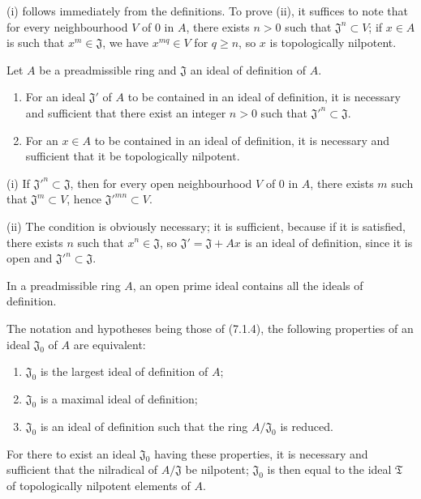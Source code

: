 (i) follows immediately from the definitions. To prove (ii), it suffices to
note that for every neighbourhood $V$ of $0$ in $A$, there exists $n>0$ such that
$\mathfrak J^n\subset V$; if $x\in A$ is such that $x^m\in\mathfrak J$, we have
$x^{mq}\in V$ for $q\geq n$, so $x$ is topologically nilpotent.

\begin{proposition}[7.1.4]
\label{0.7.1.4}
Let $A$ be a preadmissible ring and $\mathfrak J$ an ideal of definition of
$A$.
\begin{enumerate}
  \item[{\upshape(i)}] For an ideal $\mathfrak J'$ of $A$ to be contained
    in an ideal of definition, it is necessary and sufficient that there exist an integer
    $n>0$ such that ${\mathfrak J'}^n\subset\mathfrak J$.
  \item[{\upshape(ii)}] For an $x\in A$ to be contained in an ideal of
    definition, it is necessary and sufficient that it be topologically nilpotent.
\end{enumerate}
\end{proposition}

(i) If ${\mathfrak J'}^n\subset\mathfrak J$, then for every open neighbourhood $V$ of
$0$ in $A$, there exists $m$ such that $\mathfrak J^m\subset V$, hence
${\mathfrak J'}^{mn}\subset V$.

(ii) The condition is obviously necessary; it is sufficient, because if it
is satisfied, there exists $n$ such that $x^n\in\mathfrak J$, so
$\mathfrak J'=\mathfrak J+Ax$ is an ideal of definition, since it is open
and ${\mathfrak J'}^n\subset\mathfrak J$.

\begin{corollary}[7.1.5]
\label{0.7.1.5}
In a preadmissible ring $A$, an open prime ideal contains all the
ideals of definition.
\end{corollary}

\begin{corollary}[7.1.6]
\label{0.7.1.6}
The notation and hypotheses being those of \textup{(7.1.4)}, the following properties
of an ideal $\mathfrak J_0$ of $A$ are equivalent:
\begin{enumerate}
  \item[$a)$] $\mathfrak J_0$ is the largest ideal of definition of $A$;
  \item[$b)$] $\mathfrak J_0$ is a maximal ideal of definition;
  \item[$c)$] $\mathfrak J_0$ is an ideal of definition such that the ring
    $A/\mathfrak J_0$ is reduced.
\end{enumerate}
For there to exist an ideal $\mathfrak J_0$ having these properties, it is necessary and
sufficient that the nilradical of $A/\mathfrak J$ be nilpotent; $\mathfrak J_0$
is then equal to the ideal $\mathfrak T$ of topologically nilpotent elements
of $A$.
\end{corollary}


